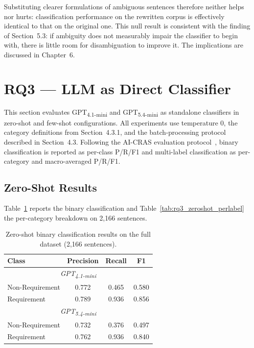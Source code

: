 Substituting clearer formulations of ambiguous sentences therefore neither helps nor hurts: classification performance on the rewritten corpus is effectively identical to that on the original one. This null result is consistent with the finding of Section~5.3: if ambiguity does not measurably impair the classifier to begin with, there is little room for disambiguation to improve it. The implications are discussed in Chapter~6.

\section{RQ3 --- LLM as Direct Classifier}

This section evaluates GPT\textsubscript{4.1-mini} and GPT\textsubscript{5.4-mini} as standalone classifiers in zero-shot and few-shot configurations. All experiments use temperature 0, the category definitions from Section~4.3.1, and the batch-processing protocol described in Section~4.3. Following the AI-CRAS evaluation protocol~\cite{casalicchio2024aicras}, binary classification is reported as per-class P/R/F1 and multi-label classification as per-category and macro-averaged P/R/F1.

\subsection{Zero-Shot Results}

Table~\ref{tab:rq3_zeroshot} reports the binary classification and Table~\ref{tab:rq3_zeroshot_perlabel} the per-category breakdown on 2,166 sentences.

\begin{table}[h]
\centering
\caption{Zero-shot binary classification results on the full dataset (2,166 sentences).}
\label{tab:rq3_zeroshot}
\begin{tabular}{lccc}
\toprule
Class & Precision & Recall & F1 \\
\midrule
\multicolumn{4}{c}{\textit{GPT\textsubscript{4.1-mini}}} \\
\midrule
Non-Requirement & 0.772 & 0.465 & 0.580 \\
Requirement     & 0.789 & 0.936 & 0.856 \\
\midrule
\multicolumn{4}{c}{\textit{GPT\textsubscript{5.4-mini}}} \\
\midrule
Non-Requirement & 0.732 & 0.376 & 0.497 \\
Requirement     & 0.762 & 0.936 & 0.840 \\
\bottomrule
\end{tabular}
\end{table}

